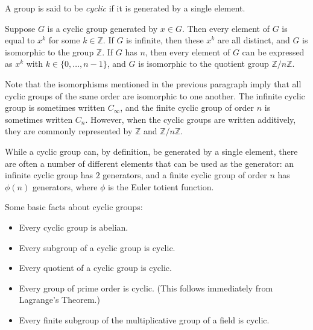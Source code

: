 \documentclass{article}
\def\Z{\mathbb{Z}}
\begin{document}

A group is said to be \emph{cyclic} if it is generated by a single element.

Suppose $G$ is a cyclic group generated by $x\in G$.
Then every element of $G$ is equal to $x^k$ for some $k\in \Z$.
If $G$ is infinite, then these $x^k$ are all distinct,
and $G$ is isomorphic to the group $\Z$.
If $G$ has  $n$,
then every element of $G$ can be expressed as $x^k$ with $k\in\{0,\dots,n-1\}$,
and $G$ is isomorphic to the quotient group $\Z/n\Z$.

Note that the isomorphisms mentioned in the previous paragraph
imply that all cyclic groups of the same order are isomorphic to one another.
The infinite cyclic group is sometimes written $C_\infty$,
and the finite cyclic group of order $n$ is sometimes written $C_n$.
However, when the cyclic groups are written additively,
they are commonly represented by $\Z$ and $\Z/n\Z$.

While a cyclic group can, by definition, be generated by a single element,
there are often a number of different elements that can be used as the generator: an infinite cyclic group has $2$ generators,
and a finite cyclic group of order $n$ has $\phi(n)$ generators,
where $\phi$ is the Euler totient function.

Some basic facts about cyclic groups:
\begin{itemize}
\item Every cyclic group is abelian.
\item Every subgroup of a cyclic group is cyclic.
\item Every quotient of a cyclic group is cyclic.
\item Every group of prime order is cyclic. (This follows immediately from Lagrange's Theorem.)
\item Every finite subgroup of the multiplicative group of a field is cyclic.
\end{itemize}
\end{document}

